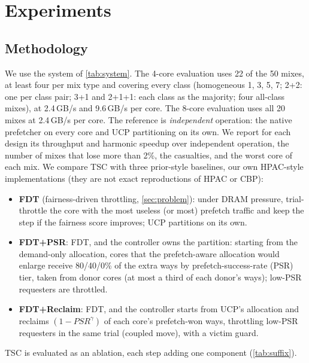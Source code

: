 \section{Experiments}
\label{sec:experiments}

\subsection{Methodology}
We use the system of \cref{tab:system}.  The 4-core evaluation uses 22 of the 50 mixes, at least four per mix type
and covering every class (homogeneous 1, 3, 5, 7; 2+2: one per class pair; 3+1 and 2+1+1: each class as the majority;
four all-class mixes), at 2.4\,GB/s and 9.6\,GB/s per core.  The 8-core evaluation uses all 20 mixes at 2.4\,GB/s per
core.  The reference is \emph{independent} operation: the native prefetcher on every core and UCP partitioning on its
own.  We report for each design its throughput and harmonic speedup over independent operation, the number of mixes that
lose more than 2\%, the casualties, and the worst core of each mix.  We compare TSC with three prior-style baselines, our own HPAC-style implementations (they are not exact
reproductions of HPAC or CBP):
\begin{itemize}
  \item \textbf{FDT} (fairness-driven throttling, \cref{sec:problem}): under DRAM pressure, trial-throttle the core with
        the most useless (or most) prefetch traffic and keep the step if the fairness score improves; UCP partitions on
        its own.
  \item \textbf{FDT+PSR}: FDT, and the controller owns the partition: starting from the demand-only allocation, cores
        that the prefetch-aware allocation would enlarge receive 80/40/0\% of the extra ways by prefetch-success-rate
        (PSR) tier, taken from donor cores (at most a third of each donor's ways); low-PSR requesters are throttled.
  \item \textbf{FDT+Reclaim}: FDT, and the controller starts from UCP's allocation and reclaims
        $(1-\mathit{PSR}^\gamma)$ of each core's prefetch-won ways, throttling low-PSR requesters in the same trial
        (coupled move), with a victim guard.
\end{itemize}
TSC is evaluated as an ablation, each step adding one component (\cref{tab:suffix}).

